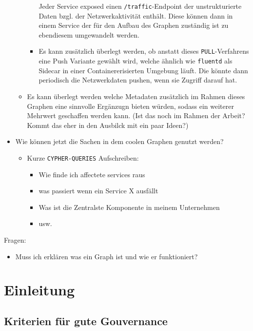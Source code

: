 \documentclass[
	12pt,
	BCOR=5mm,
	DIV=12,
	headinclude=on,
	footinclude=off,
	parskip=half,
	bibliography=totoc,
	listof=entryprefix,
	toc=listof,
	numbers=noenddot,
	plainfootsepline
]{scrreprt}
\begin{document}
\begin{itemize}
\begin{itemize}
\begin{itemize}
			Jeder Service exposed einen \texttt{/traffic}-Endpoint der unstrukturierte Daten bzgl. der Netzwerkaktivität enthält. Diese können dann in einem Service der für den Aufbau des Graphen zuständig ist zu ebendiesem umgewandelt werden.
			\item Es kann zusätzlich überlegt werden, ob anstatt dieses \texttt{PULL}-Verfahrens eine Push Variante gewählt wird, welche ähnlich wie \texttt{fluentd} als Sidecar in einer Containererisierten Umgebung läuft. Die könnte dann periodisch die Netzwerkdaten pushen, wenn sie Zugriff darauf hat.
		\end{itemize}
		\item Es kann überlegt werden welche Metadaten zusätzlich im Rahmen dieses Graphen eine sinnvolle Ergänzugn bieten würden, sodass ein weiterer Mehrwert geschaffen werden kann. (Ist das noch im Rahmen der Arbeit? Kommt das eher in den Ausbilck mit ein paar Ideen?)
	\end{itemize}
	\item Wie können jetzt die Sachen in dem coolen Graphen genutzt werden?
	\begin{itemize}
		\item Kurze \texttt{CYPHER-QUERIES} Aufschreiben:
		\begin{itemize}
			\item Wie finde ich affectete services raus
			\item was passiert wenn ein Service X ausfällt
			\item Was ist die Zentralste Komponente in meinem Unternehmen
			\item usw.
		\end{itemize}
	\end{itemize}
\end{itemize}

Fragen:
\begin{itemize}
	\item Muss ich erklären was ein Graph ist und wie er funktioniert?
\end{itemize}

\chapter{Einleitung}



\section{Kriterien für gute Gouvernance}
\end{document}
